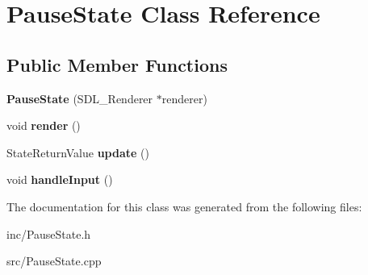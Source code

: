 \hypertarget{class_pause_state}{}\section{Pause\+State Class Reference}
\label{class_pause_state}
\subsection*{Public Member Functions}
\begin{DoxyCompactItemize}
\item 
\mbox{\label{class_pause_state_ac7c170b841536b0dce3afa64e6f08067}} 
{\bfseries Pause\+State} (S\+D\+L\+\_\+\+Renderer $\ast$renderer)
\item 
\mbox{\label{class_pause_state_a9f4e24345a737cd3e623697409cf5bf4}} 
void {\bfseries render} ()
\item 
\mbox{\label{class_pause_state_a6ec85365907ce10a0cb39aacc0e8b67d}} 
State\+Return\+Value {\bfseries update} ()
\item 
\mbox{\label{class_pause_state_aab70203b42f65f4e7df5dde6a23bfd13}} 
void {\bfseries handle\+Input} ()
\end{DoxyCompactItemize}


The documentation for this class was generated from the following files\+:\begin{DoxyCompactItemize}
\item 
inc/Pause\+State.\+h\item 
src/Pause\+State.\+cpp\end{DoxyCompactItemize}
